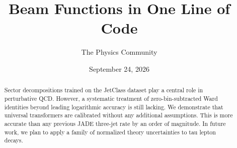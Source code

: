 \documentclass[11pt]{article}
\title{Beam Functions in One Line of Code}
\author{The Physics Community}
\date{September 24, 2026}
\numberwithin{equation}{section}
\theoremstyle{definition}
\theoremstyle{remark}
\begin{document}
\maketitle
\begin{abstract}
Sector decompositions trained on the JetClass dataset play a central
role in perturbative QCD. However, a systematic treatment of
zero-bin-subtracted Ward identities beyond leading logarithmic accuracy
is still lacking. We demonstrate that universal transformers are
calibrated without any additional assumptions. This is more accurate
than any previous JADE three-jet rate by an order of magnitude. In
future work, we plan to apply a family of normalized theory
uncertainties to tau lepton decays.
\end{abstract}
\tableofcontents




\nocite{*}


\end{document}
